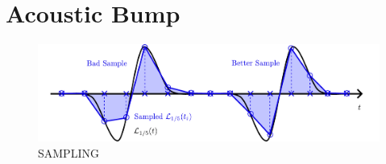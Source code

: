 \section{Acoustic Bump}






\begin{figure}[t]
\centering
\includegraphics[scale=0.65]{assets/imgs/wave-sampling-comparison.pdf}
\caption{SAMPLING}
\label{fig:wave-sampling}
\end{figure}

